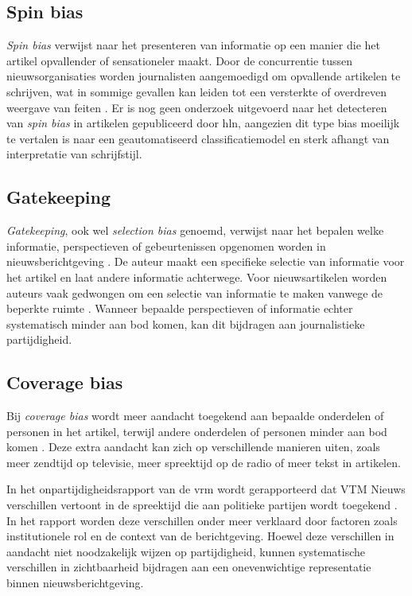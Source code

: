 \subsection{Spin bias}

\textit{Spin bias} verwijst naar het presenteren van informatie op een manier die het artikel opvallender of sensationeler maakt. Door de concurrentie tussen nieuwsorganisaties worden journalisten aangemoedigd om opvallende artikelen te schrijven, wat in sommige gevallen kan leiden tot een versterkte of overdreven weergave van feiten \autocite{Alsem2008}. Er is nog geen onderzoek uitgevoerd naar het detecteren van \textit{spin bias} in artikelen gepubliceerd door \gls{hln}, aangezien dit type bias moeilijk te vertalen is naar een geautomatiseerd classificatiemodel en sterk afhangt van interpretatie van schrijfstijl.

\subsection{Gatekeeping}

\textit{Gatekeeping}, ook wel \textit{selection bias} genoemd, verwijst naar het bepalen welke informatie, perspectieven of gebeurtenissen opgenomen worden in nieuwsberichtgeving \autocite{CALD2025}. De auteur maakt een specifieke selectie van informatie voor het artikel en laat andere informatie achterwege. Voor nieuwsartikelen worden auteurs vaak gedwongen om een selectie van informatie te maken vanwege de beperkte ruimte \autocite{SaezTrumper2013}. Wanneer bepaalde perspectieven of informatie echter systematisch minder aan bod komen, kan dit bijdragen aan journalistieke partijdigheid.

\subsection{Coverage bias}

Bij \textit{coverage bias} wordt meer aandacht toegekend aan bepaalde onderdelen of personen in het artikel, terwijl andere onderdelen of personen minder aan bod komen \autocite{DAlessio2006}. Deze extra aandacht kan zich op verschillende manieren uiten, zoals meer zendtijd op televisie, meer spreektijd op de radio of meer tekst in artikelen.

In het onpartijdigheidsrapport van de \gls{vrm} wordt gerapporteerd dat VTM Nieuws verschillen vertoont in de spreektijd die aan politieke partijen wordt toegekend \autocite{VanAelst2024}. In het rapport worden deze verschillen onder meer verklaard door factoren zoals institutionele rol en de context van de berichtgeving. Hoewel deze verschillen in aandacht niet noodzakelijk wijzen op partijdigheid, kunnen systematische verschillen in zichtbaarheid bijdragen aan een onevenwichtige representatie binnen nieuwsberichtgeving.

